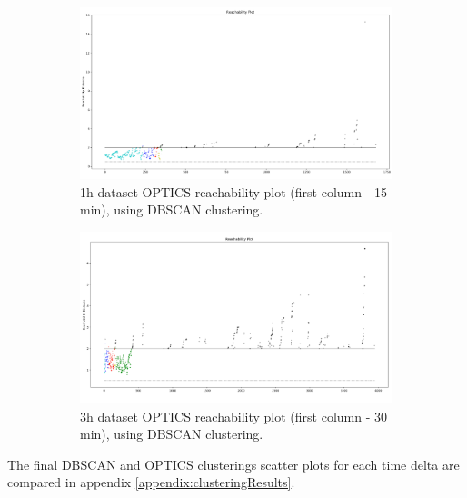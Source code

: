 \begin{figure}[H]
  \centering
  \begin{subfigure}{.5\textwidth}\captionsetup{width=.8\linewidth}
    \centering
    \includegraphics[width=1\textwidth]{./images/clusteringResults/1h-1-reachabilityPlot.png}
  \caption{1h dataset OPTICS reachability plot (first column - 15 min), using DBSCAN clustering.}
  \end{subfigure}%
  \hfill
  \begin{subfigure}{.5\textwidth}\captionsetup{width=.8\linewidth}
    \centering
    \includegraphics[width=1\textwidth]{./images/clusteringResults/3h-1-reachabilityPlot.png}
    \caption{3h dataset OPTICS reachability plot (first column - 30 min), using DBSCAN clustering.}
  \end{subfigure}
  \caption{}
  \label{figure:OPTICSResultsReachabilityPlot}
  \end{figure}



The final DBSCAN and OPTICS clusterings scatter plots for each time delta are compared in appendix \ref{appendix:clusteringResults}.

